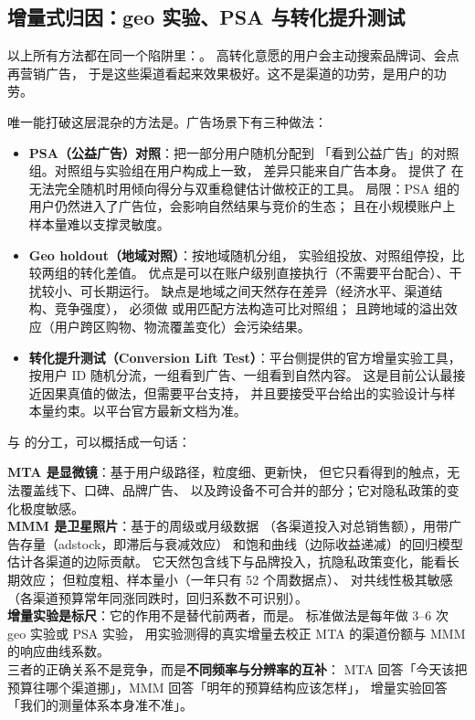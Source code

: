 \subsection{增量式归因：geo 实验、PSA 与转化提升测试}

以上所有方法都在同一个陷阱里：。
高转化意愿的用户会主动搜索品牌词、会点再营销广告，
于是这些渠道看起来效果极好。这不是渠道的功劳，是用户的功劳。

唯一能打破这层混杂的方法是。广告场景下有三种做法：

\begin{itemize}
  \item \textbf{PSA（公益广告）对照}：把一部分用户随机分配到
        「看到公益广告」的对照组。对照组与实验组在用户构成上一致，
        差异只能来自广告本身。\cite{dudik2011ee,swaminathan2015counterfactual} 提供了
        在无法完全随机时用倾向得分与双重稳健估计做校正的工具。
        局限：PSA 组的用户仍然进入了广告位，会影响自然结果与竞价的生态；
        且在小规模账户上样本量难以支撑灵敏度。
  \item \textbf{Geo holdout（地域对照）}：按地域随机分组，
        实验组投放、对照组停投，比较两组的转化差值。
        优点是可以在账户级别直接执行（不需要平台配合）、干扰较小、可长期运行。
        缺点是地域之间天然存在差异（经济水平、渠道结构、竞争强度），
        必须做 或用匹配方法构造可比对照组；
        且跨地域的溢出效应（用户跨区购物、物流覆盖变化）会污染结果。
  \item \textbf{转化提升测试（Conversion Lift Test）}：平台侧提供的官方增量实验工具，
        按用户 ID 随机分流，一组看到广告、一组看到自然内容。
        这是目前公认最接近因果真值的做法，但需要平台支持，
        并且要接受平台给出的实验设计与样本量约束。以平台官方最新文档为准。
\end{itemize}

 与
 的分工，可以概括成一句话：

\begin{keypoint}
\textbf{MTA 是显微镜}：基于用户级路径，粒度细、更新快，
但它只看得到的触点，无法覆盖线下、口碑、品牌广告、
以及跨设备不可合并的部分；它对隐私政策的变化极度敏感。\\
\textbf{MMM 是卫星照片}：基于的周级或月级数据
（各渠道投入对总销售额），用带广告存量（adstock，即滞后与衰减效应）
和饱和曲线（边际收益递减）的回归模型估计各渠道的边际贡献。
它天然包含线下与品牌投入，抗隐私政策变化，能看长期效应；
但粒度粗、样本量小（一年只有 52 个周数据点）、
对共线性极其敏感（各渠道预算常年同涨同跌时，回归系数不可识别）。\\
\textbf{增量实验是标尺}：它的作用不是替代前两者，而是。
标准做法是每年做 3--6 次 geo 实验或 PSA 实验，
用实验测得的真实增量去校正 MTA 的渠道份额与 MMM 的响应曲线系数。\\
三者的正确关系不是竞争，而是\textbf{不同频率与分辨率的互补}：
MTA 回答「今天该把预算往哪个渠道挪」，MMM 回答「明年的预算结构应该怎样」，
增量实验回答「我们的测量体系本身准不准」。
\end{keypoint}

